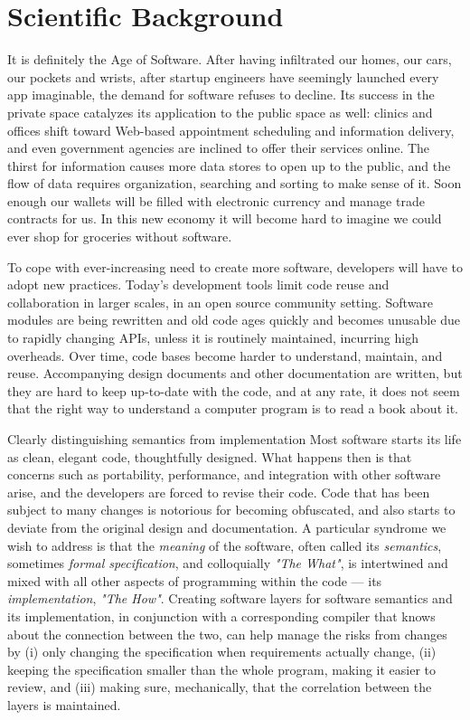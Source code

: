 \section{Scientific Background}

It is definitely the Age of Software.
After having infiltrated our homes, our cars, our pockets and wrists,
after startup engineers have seemingly launched every app imaginable,
the demand for software refuses to decline.
Its success in the private space catalyzes its application to the public
space as well: clinics and offices shift toward Web-based appointment
scheduling and information delivery, and even government agencies are
inclined to offer their services online.
The thirst for information causes more data stores to open up to the
public, and the flow of data requires organization, searching and sorting
to make sense of it.
Soon enough our wallets will be filled with electronic currency and
manage trade contracts for us.
In this new economy it will become hard to imagine we could ever
shop for groceries without software.

To cope with ever-increasing need to create more software, developers
will have to adopt new practices.
Today's development tools limit code reuse and collaboration in larger
scales, \eg in an open source community setting.
Software modules are being rewritten and old code ages quickly and becomes
unusable due to rapidly changing APIs, unless it is routinely maintained,
incurring high overheads.
Over time, code bases become harder to understand, maintain, and reuse.
Accompanying design documents and other documentation are written, but
they are hard to keep up-to-date with the code, and at any rate, it does
not seem that the right way to understand a computer program is to read
a book about it.

\begin{subparagraph}{Clearly distinguishing semantics from implementation}
Most software starts its life as clean, elegant code, thoughtfully designed.
What happens then is that concerns such as portability, performance,
and integration with other software arise, and the developers are forced
to revise their code.
Code that has been subject to many changes is notorious for becoming
obfuscated, and also starts to deviate from the original design and
documentation.
A particular syndrome we wish to address is that the \emph{meaning} of
the software, often called its \emph{semantics}, sometimes \emph{formal specification},
and colloquially \emph{"The What"}, is intertwined and mixed with all
other aspects of programming within the code --- its \emph{implementation},
\emph{"The How"}.
Creating software layers for software semantics and its implementation,
in conjunction with a corresponding compiler that knows about the connection
between the two, can help manage the risks from changes by (i) only changing the
specification when requirements actually change, (ii) keeping the specification
smaller than the whole program, making it easier to review, and (iii) making
sure, mechanically, that the correlation between the layers is maintained.
\end{subparagraph}

